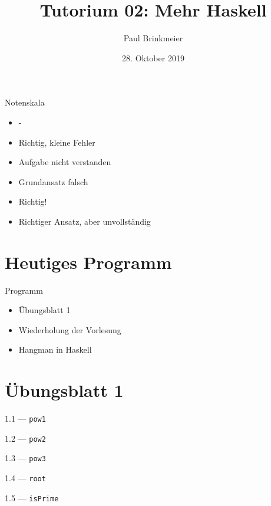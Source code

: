 \documentclass{beamer}
\title{Tutorium 02: Mehr Haskell}
\author{Paul Brinkmeier}
\institute{Tutorium Programmierparadigmen am KIT}
\date{28. Oktober 2019}
\newcommand{\code}[1]{
	\begin{mdframed}
		
	\end{mdframed}
}
\begin{document}
\begin{frame}
	\titlepage
\end{frame}

\begin{frame}{Notenskala}
	\begin{itemize}
		\item -
		\item Richtig, kleine Fehler
		\item Aufgabe nicht verstanden
		\item Grundansatz falsch
		\item Richtig!
		\item Richtiger Ansatz, aber unvollständig
	\end{itemize}
\end{frame}

\section{Heutiges Programm}
\begin{frame}{Programm}
	\begin{itemize}
		\item Übungsblatt 1
		\item Wiederholung der Vorlesung
		\item Hangman in Haskell
	\end{itemize}
\end{frame}

\section{Übungsblatt 1}

\begin{frame}{1.1 --- \texttt{pow1}}
	\code{demos/Arithmetik1.hs}
\end{frame}

\begin{frame}{1.2 --- \texttt{pow2}}
	\code{demos/Arithmetik2.hs}
\end{frame}

\begin{frame}{1.3 --- \texttt{pow3}}
	\code{demos/Arithmetik3.hs}
\end{frame}

\begin{frame}{1.4 --- \texttt{root}}
	\code{demos/Arithmetik4.hs}
\end{frame}

\begin{frame}{1.5 --- \texttt{isPrime}}
	\code{demos/Arithmetik5.hs}
\end{frame}
\end{document}
